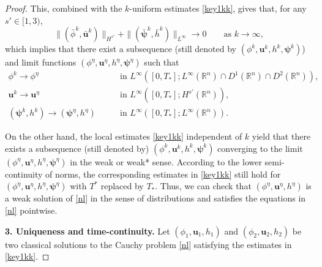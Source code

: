 \documentclass[11pt,reqno]{amsart}
\numberwithin{rk}{section}
\numberwithin{prop}{section}
\numberwithin{mydef}{section}
\numberwithin{lem}{section}
\numberwithin{equation}{section}
\numberwithin{thm}{section}
\begin{document}
\begin{proof}
This, combined with the $k$-uniform estimates \eqref{key1kk}, gives that, for any $s'\in [1,3)$,
\begin{equation*}
\|(\bar\phi^{k},\bar {\boldsymbol{u}}^{k})\|_{H^{s'}}+\|(\bar{\boldsymbol{\psi}}^{k},\bar h^{k})\|_{L^\infty}\to 0\qquad \text{as $k\to\infty$},
\end{equation*}
which implies that there exist a subsequence (still denoted by $(\phi^k,\boldsymbol{u}^k,h^k ,\boldsymbol{\psi}^k)$) and limit functions  $(\phi^\eta,\boldsymbol{u}^\eta,h^\eta, \boldsymbol{\psi}^\eta)$ such that
\begin{equation*} 
\begin{aligned}
\phi^k\to \phi^\eta\qquad &\text{in $L^\infty([0,T_*];L^\infty(\mathbb{R}^n)\cap D^1(\mathbb{R}^n)\cap D^2(\mathbb{R}^n))$},\\
\boldsymbol{u}^k\to \boldsymbol{u}^\eta \qquad   &\text{in $L^\infty([0,T_*];H^{s'}(\mathbb{R}^n))$},\\
(\boldsymbol{\psi}^k,h^k)\to (\boldsymbol{\psi}^\eta,h^\eta) \qquad  &\text{in $L^\infty([0,T_*];L^\infty(\mathbb{R}^n))$}.
\end{aligned}
\end{equation*}

On the other hand,    the local estimates  \eqref{key1kk} independent of $k$ yield that there exists a subsequence (still denoted by) $(\phi^k,\boldsymbol{u}^k, h^k, \boldsymbol{\psi}^k)$ converging to the limit $(\phi^\eta,\boldsymbol{u}^\eta, h^\eta, \boldsymbol{\psi}^\eta)$ in the weak or weak* sense.
According to the lower semi-continuity of norms,  the corresponding estimates in \eqref{key1kk} still hold for  $(\phi^\eta,\boldsymbol{u}^\eta, h^\eta,\boldsymbol{\psi}^\eta)$ with $T^*$ replaced by $T_*$. Thus, we can check that  $(\phi^\eta,\boldsymbol{u}^\eta, h^\eta)$ is a weak solution of \eqref{nl} in the sense of distributions and satisfies the equations in \eqref{nl} pointwise.

\smallskip
\textbf{3. Uniqueness and time-continuity.}  Let $(\phi_1,  \boldsymbol{u}_1, h_1)$ and $(\phi_2, \boldsymbol{u}_2, h_2)$ be two classical solutions to the   Cauchy problem \eqref{nl} satisfying the  estimates in \eqref{key1kk}.


\end{proof}
\end{document}
